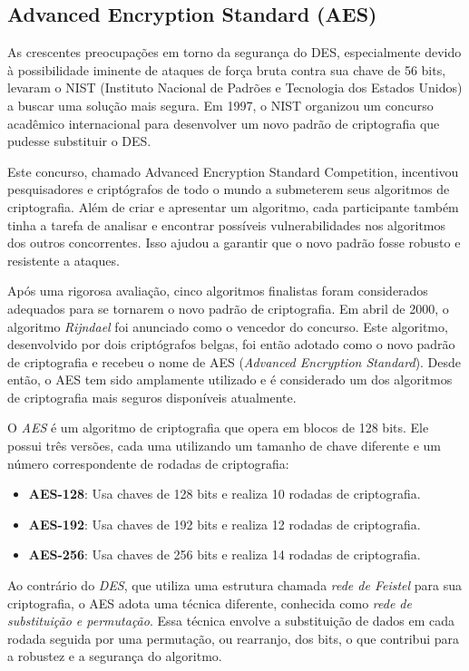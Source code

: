 \subsection{Advanced Encryption Standard (AES)}
\label{sec:aes}

As crescentes preocupações em torno da segurança do DES, especialmente devido à possibilidade iminente de ataques de força bruta contra sua chave de 56 bits, levaram o NIST (Instituto Nacional de Padrões e Tecnologia dos Estados Unidos) a buscar uma solução mais segura.
Em 1997, o NIST organizou um concurso acadêmico internacional para desenvolver um novo padrão de criptografia que pudesse substituir o DES.

Este concurso, chamado Advanced Encryption Standard Competition, incentivou pesquisadores e criptógrafos de todo o mundo a submeterem seus algoritmos de criptografia.
Além de criar e apresentar um algoritmo, cada participante também tinha a tarefa de analisar e encontrar possíveis vulnerabilidades nos algoritmos dos outros concorrentes.
Isso ajudou a garantir que o novo padrão fosse robusto e resistente a ataques.

Após uma rigorosa avaliação, cinco algoritmos finalistas foram considerados adequados para se tornarem o novo padrão de criptografia.
Em abril de 2000, o algoritmo {\em Rijndael} foi anunciado como o vencedor do concurso.
Este algoritmo, desenvolvido por dois criptógrafos belgas, foi então adotado como o novo padrão de criptografia e recebeu o nome de AES ({\em Advanced Encryption Standard}).
Desde então, o AES tem sido amplamente utilizado e é considerado um dos algoritmos de criptografia mais seguros disponíveis atualmente.

O \textit{AES} é um algoritmo de criptografia que opera em blocos de 128 bits.
Ele possui três versões, cada uma utilizando um tamanho de chave diferente e um número correspondente de rodadas de criptografia:

\begin{itemize}
    \item[] \textbf{AES-128}: Usa chaves de 128 bits e realiza 10 rodadas de criptografia.
    \item[] \textbf{AES-192}: Usa chaves de 192 bits e realiza 12 rodadas de criptografia.
    \item[] \textbf{AES-256}: Usa chaves de 256 bits e realiza 14 rodadas de criptografia.
\end{itemize}

Ao contrário do \textit{DES}, que utiliza uma estrutura chamada \textit{rede de Feistel} para sua criptografia, o AES adota uma técnica diferente, conhecida como \textit{rede de substituição e permutação}.
Essa técnica envolve a substituição de dados em cada rodada seguida por uma permutação, ou rearranjo, dos bits, o que contribui para a robustez e a segurança do algoritmo.

